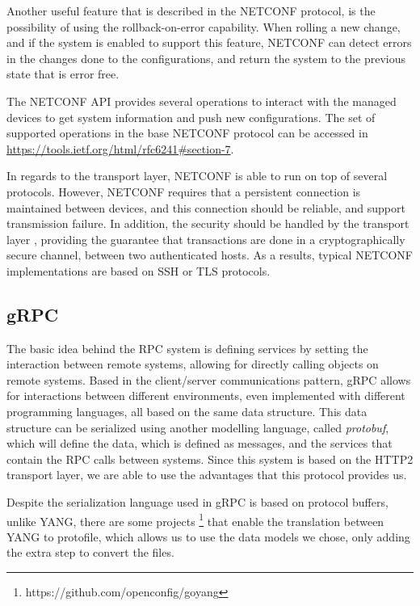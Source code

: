 \par Another useful feature that is described in the NETCONF protocol, is the possibility of using the rollback-on-error capability. When rolling a new change,
and if the system is enabled to support this feature, NETCONF can detect errors in the changes done to the configurations, and return the system to the previous
state that is error free. 

\par The NETCONF API provides several operations to interact with the managed devices to get system information and push new configurations. The set of supported 
operations in the base NETCONF protocol can be accessed in \url{https://tools.ietf.org/html/rfc6241#section-7}. 

\par In regards to the transport layer, NETCONF is able to run on top of several protocols. However, NETCONF requires that a persistent connection is maintained 
between devices, and this connection should be reliable, and support transmission failure. In addition, the security should be handled by the transport layer 
\cite{jurgen_schonwalder_network_2012}, providing the guarantee that transactions are done in a 
cryptographically secure channel, between two authenticated hosts. As a results, typical NETCONF implementations are based on SSH or TLS protocols.

\subsection {gRPC}  \label {ssec:grpc}

The basic idea behind the RPC system is defining services by setting the interaction between remote systems, allowing for directly calling objects on remote
systems. Based in the client/server communications pattern, gRPC allows for interactions between different environments, even implemented with different programming
languages, all based on the same data structure. This data structure can be serialized using another modelling language, called \textit {protobuf}, which will
define the data, which is defined as messages, and the services that contain the RPC calls between systems. Since this system is based on the HTTP2 transport layer,
we are able to use the advantages that this protocol provides us.

\par Despite the serialization language used in gRPC is based on protocol buffers, unlike YANG, there are some projects
\footnote {https://github.com/openconfig/goyang} that enable the translation between YANG to protofile, which allows us to use the data models we chose, only adding
the extra step to convert the files.

